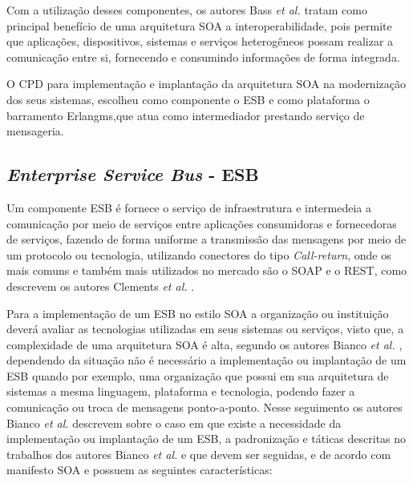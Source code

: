 Com a utilização desses componentes, os autores Bass \textit{et al.}  \cite{bass2003software} tratam como principal benefício de uma arquitetura \acrshort{SOA} a interoperabilidade, pois permite que aplicações, dispositivos, sistemas e serviços heterogêneos possam realizar a comunicação entre si, fornecendo e consumindo informações  de forma integrada. 

O \acrshort{CPD} para implementação e implantação da arquitetura \acrshort{SOA} na modernização dos seus sistemas, escolheu como componente o \acrshort{ESB} e como plataforma o barramento Erlangms\cite{Agilar},que atua como intermediador prestando serviço de mensageria.


\subsection{\textit{Enterprise Service Bus} - ESB}

Um componente \acrshort{ESB} é fornece o serviço de infraestrutura e intermedeia a comunicação por meio de serviços entre aplicações consumidoras e fornecedoras de serviços, fazendo de forma uniforme a transmissão das mensagens por meio de um protocolo ou tecnologia, utilizando conectores do tipo \textit{Call-return}, onde os mais comuns e também mais utilizados no mercado são o \acrshort{SOAP} e o \acrshort{REST}, como descrevem  os autores Clements \textit{et al.} \cite{clements2002documenting}.

Para a implementação de um \acrshort{ESB} no estilo \acrshort{SOA} a organização ou instituição deverá avaliar as tecnologias utilizadas em seus sistemas ou serviços, visto que, a complexidade de uma arquitetura \acrshort{SOA} é alta, segundo os autores Bianco \textit{et al.} \cite{bianco2011architecting}, dependendo da situação não é necessário a implementação ou implantação de um \acrshort{ESB} quando por exemplo, uma organização que  possui em sua arquitetura de sistemas a mesma linguagem, plataforma e tecnologia, podendo fazer a comunicação ou troca de mensagens ponto-a-ponto. Nesse seguimento os autores Bianco \textit{et al.} \cite{bianco2011architecting} descrevem sobre o caso em que existe a necessidade da implementação ou implantação de um \acrshort{ESB}, a padronização e táticas descritas no trabalhos dos autores Bianco \textit{et al.}  \cite{bianco2011architecting} e que devem ser seguidas, e de acordo com manifesto \acrshort{SOA}\cite{erl2009soa} e possuem as seguintes características:

